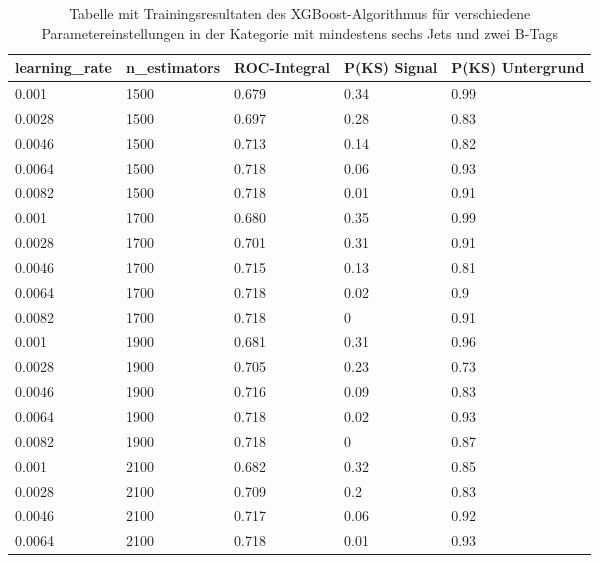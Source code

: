 \begin{table}[tbp]\parbox{12cm}{
\renewcommand\thetable{A.5}
  \caption[XGBoost 6j2t Ergebnisse]{Tabelle mit Trainingsresultaten des XGBoost-Algorithmus f\"ur verschiedene Parametereinstellungen in der Kategorie mit mindestens sechs Jets und zwei B-Tags}%
  }\label{tab:xgboost_6j2t}
  \begin{center}
  \begin{tabular}{lllll}
  \hline
  learning\_rate & n\_estimators & ROC-Integral & P(KS) Signal & P(KS) Untergrund\\
  \hline
\num{0,001}  & \num{1500} & \num{0,679} & \num{0,34} & \num{0,99}\\
\num{0,0028} & \num{1500} & \num{0,697} & \num{0,28} & \num{0,83}\\
\num{0,0046} & \num{1500} & \num{0,713} & \num{0,14} & \num{0,82}\\
\num{0,0064} & \num{1500} & \num{0,718} & \num{0,06} & \num{0,93}\\
\num{0,0082} & \num{1500} & \num{0,718} & \num{0,01} & \num{0,91}\\
\num{0,001}  & \num{1700} & \num{0,680} & \num{0,35} & \num{0,99}\\
\num{0,0028} & \num{1700} & \num{0,701} & \num{0,31} & \num{0,91}\\
\num{0,0046} & \num{1700} & \num{0,715} & \num{0,13} & \num{0,81}\\
\num{0,0064} & \num{1700} & \num{0,718} & \num{0,02} & \num{0,9}\\
\num{0,0082} & \num{1700} & \num{0,718} & \num{0}    & \num{0,91}\\
\num{0,001}  & \num{1900} & \num{0,681} & \num{0,31} & \num{0,96}\\
\num{0,0028} & \num{1900} & \num{0,705} & \num{0,23} & \num{0,73}\\
\num{0,0046} & \num{1900} & \num{0,716} & \num{0,09} & \num{0,83}\\
\num{0,0064} & \num{1900} & \num{0,718} & \num{0,02} & \num{0,93}\\
\num{0,0082} & \num{1900} & \num{0,718} & \num{0}    & \num{0,87}\\
\num{0,001}  & \num{2100} & \num{0,682} & \num{0,32} & \num{0,85}\\
\num{0,0028} & \num{2100} & \num{0,709} & \num{0,2}  & \num{0,83}\\
\num{0,0046} & \num{2100} & \num{0,717} & \num{0,06} & \num{0,92}\\
\num{0,0064} & \num{2100} & \num{0,718} & \num{0,01} & \num{0,93}\\

\end{tabular}
\end{center}
\end{table}
